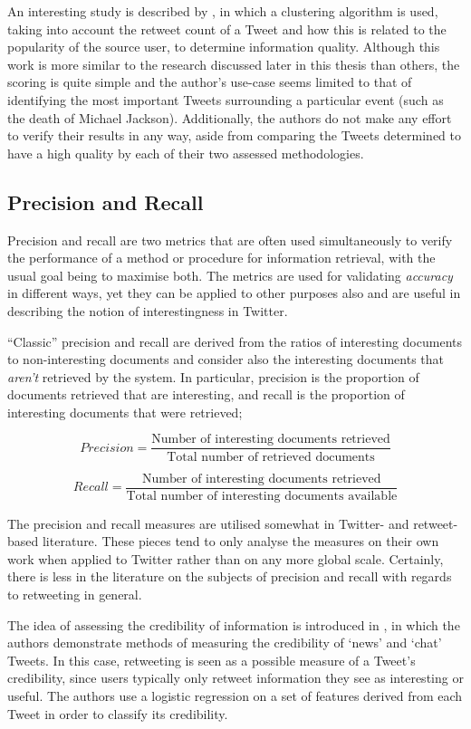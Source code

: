 An interesting study is described by \cite{lauw10}, in which a clustering algorithm is used, taking into account the retweet count of a Tweet and how this is related to the popularity of the source user, to determine information quality. Although this work is more similar to the research discussed later in this thesis than others, the scoring is quite simple and the author's use-case seems limited to that of identifying the most important Tweets surrounding a particular event (such as the death of Michael Jackson). Additionally, the authors do not make any effort to verify their results in any way, aside from comparing the Tweets determined to have a high quality by each of their two assessed methodologies.


\subsection{Precision and Recall}
Precision and recall are two metrics that are often used simultaneously to verify the performance of a method or procedure for information retrieval, with the usual goal being to maximise both. The metrics are used for validating \textit{accuracy} in different ways, yet they can be applied to other purposes also and are useful in describing the notion of interestingness in Twitter.

``Classic'' precision and recall are derived from the ratios of interesting documents to non-interesting documents and consider also the interesting documents that \textit{aren't} retrieved by the system. In particular, precision is the proportion of documents retrieved that are interesting, and recall is the proportion of interesting documents that were retrieved;

\[	
	Precision = \frac{\text{Number of interesting documents retrieved}}{\text{Total number of retrieved documents}}
\]

\[
	Recall = \frac{\text{Number of interesting documents retrieved}}{\text{Total number of interesting documents available}}
\]

The precision and recall measures are utilised somewhat in Twitter- and retweet-based literature. These pieces tend to only analyse the measures on their own work when applied to Twitter rather than on any more global scale. Certainly, there is less in the literature on the subjects of precision and recall with regards to retweeting in general.

The idea of assessing the credibility of information is introduced in \cite{castillo11}, in which the authors demonstrate methods of measuring the credibility of `news' and `chat' Tweets. In this case, retweeting is seen as a possible measure of a Tweet's credibility, since users typically only retweet information they see as interesting or useful. The authors use a logistic regression on a set of features derived from each Tweet in order to classify its credibility. 

